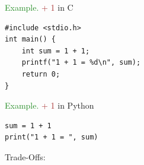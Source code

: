 \documentclass[
    xcolor={svgnames,dvipsnames},
    hyperref={colorlinks, citecolor=DeepPink4, linkcolor=DarkRed, urlcolor=DarkBlue}
    ]{beamer}  %
\newcommand{\Eg}{\textcolor{ForestGreen}{Example. }}
\newcommand{\brown}[1]{\textcolor{Brown}{\sf #1}}
\newcommand{\1}{\mathbbm 1}
\begin{document}
\begin{frame}[fragile]

    \Eg \brown{1 + 1} in C

    {\small
    \begin{verbatim}
#include <stdio.h>
int main() {
    int sum = 1 + 1;
    printf("1 + 1 = %d\n", sum);
    return 0;
}   
    \end{verbatim}
    }

\end{frame}

\begin{frame}[fragile]

    \Eg \brown{1 + 1} in Python

    {\small
    \begin{verbatim}
sum = 1 + 1
print("1 + 1 = ", sum)
    \end{verbatim}
    }

\end{frame}



\begin{frame}

    Trade-Offs:

    \begin{figure}
       \begin{center}
       \end{center}
    \end{figure}

\end{frame}
\end{document}
